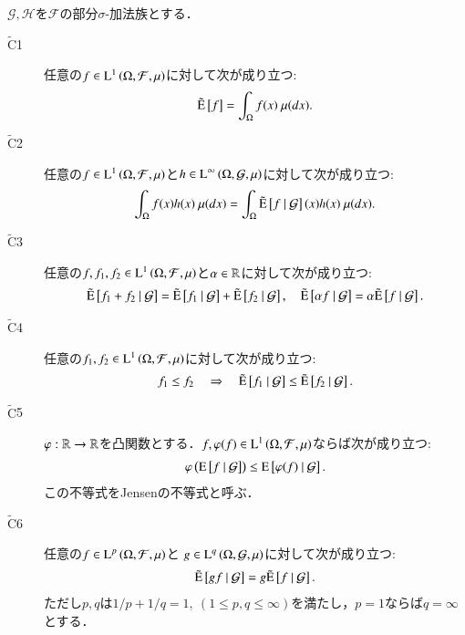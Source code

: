 	\begin{screen}
		\begin{prp}[拡張条件付き期待値の性質]
		$\mathcal{G},\mathcal{H}$を$\mathcal{F}$の部分$\sigma$-加法族とする．
		\begin{description}
			\item[$\tilde{\mathrm{C}}$1] 任意の$f \in \operatorname{L}^{1} \left(\Omega, \mathcal{F},\mu\right)$に対して次が成り立つ:
				\begin{align}
					\tilde{\operatorname{E}} \left[ f \right] = \int_{\Omega} f(x)\ \mu(dx).
				\end{align}
				
			\item[$\tilde{\mathrm{C}}$2]	任意の$f \in \operatorname{L}^{1} \left(\Omega, \mathcal{F},\mu\right)$と$h \in \operatorname{L}^{\infty} \left(\Omega, \mathcal{G},\mu\right)$に対して次が成り立つ:
				\begin{align}
					\int_{\Omega} f(x)h(x)\ \mu(dx) = \int_{\Omega} \tilde{\operatorname{E}} \left[ f \ \middle|\ \mathcal{G} \right](x)h(x)\ \mu(dx).
				\end{align}
				
			\item[$\tilde{\mathrm{C}}$3]	任意の$f,f_1,f_2 \in \operatorname{L}^{1} \left(\Omega, \mathcal{F},\mu\right)$と$\alpha \in \mathbb{R}$に対して次が成り立つ:
				\begin{align}
					\tilde{\operatorname{E}} \left[ f_1 + f_2 \ \middle|\ \mathcal{G} \right] = \tilde{\operatorname{E}} \left[ f_1 \ \middle|\ \mathcal{G} \right] + \tilde{\operatorname{E}} \left[ f_2 \ \middle|\ \mathcal{G} \right],
					\quad \tilde{\operatorname{E}} \left[ \alpha f \ \middle|\ \mathcal{G} \right] = \alpha \tilde{\operatorname{E}} \left[ f \ \middle|\ \mathcal{G} \right].
				\end{align}

			\item[$\tilde{\mathrm{C}}$4]	任意の$f_1,f_2 \in \operatorname{L}^{1} \left(\Omega, \mathcal{F},\mu\right)$に対して次が成り立つ:
				\begin{align}
					f_1 \leq f_2 \quad \Rightarrow \quad \tilde{\operatorname{E}} \left[ f_1 \ \middle|\ \mathcal{G} \right] \leq \tilde{\operatorname{E}} \left[ f_2 \ \middle|\ \mathcal{G} \right].
				\end{align}
			
			\item[$\tilde{\mathrm{C}}$5] $\varphi:\mathbb{R} \rightarrow \mathbb{R}$を凸関数とする．$f,\varphi(f) \in \operatorname{L}^{1} \left(\Omega, \mathcal{F},\mu\right)$ならば次が成り立つ:
				\begin{align}
					\varphi\left( \operatorname{E} \left[ f \ \middle|\ \mathcal{G} \right] \right) \leq \operatorname{E} \left[ \varphi(f) \ \middle|\ \mathcal{G} \right].
				\end{align}
				この不等式をJensenの不等式と呼ぶ．
				
			\item[$\tilde{\mathrm{C}}$6]	任意の$f \in \operatorname{L}^{p} \left(\Omega, \mathcal{F},\mu\right)$と
				$g \in \operatorname{L}^{q} \left(\Omega, \mathcal{G},\mu\right)$に対して次が成り立つ:
				\begin{align}
					\tilde{\operatorname{E}} \left[ gf \ \middle|\ \mathcal{G} \right] = g\tilde{\operatorname{E}} \left[ f \ \middle|\ \mathcal{G} \right].
				\end{align}
				ただし$p,q$は$1/p + 1/q = 1,\ (1 \leq p,q \leq \infty)$を満たし，$p = 1$ならば$q = \infty$とする．
				

\end{description}
\end{prp}
\end{screen}
